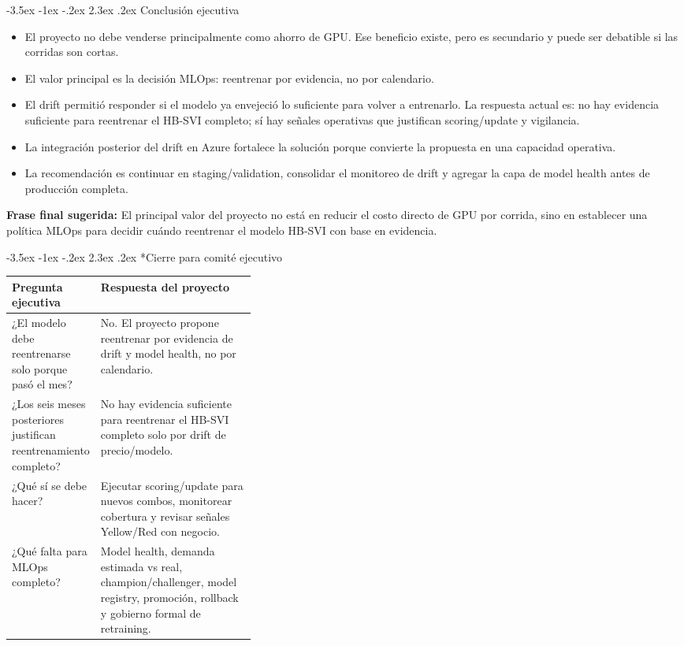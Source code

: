 \documentclass[11pt,letterpaper]{article}
\makeatletter
\renewcommand\section{\@startsection{section}{1}{\z@}
  {-3.5ex \@plus -1ex \@minus -.2ex}
  {2.3ex \@plus .2ex}
  {\Large\bfseries\sffamily\color{azulTec}}}
\newcommand{\statusbox}[1]{\colorbox{verdeClaro}{\parbox{\dimexpr\linewidth-2\fboxsep}{#1}}}
\makeatother
\begin{document}
\section{Conclusión ejecutiva}

\begin{itemize}
  \item El proyecto no debe venderse principalmente como ahorro de GPU. Ese beneficio existe, pero es secundario y puede ser debatible si las corridas son cortas.
  \item El valor principal es la decisión MLOps: reentrenar por evidencia, no por calendario.
  \item El drift permitió responder si el modelo ya envejeció lo suficiente para volver a entrenarlo. La respuesta actual es: no hay evidencia suficiente para reentrenar el HB-SVI completo; sí hay señales operativas que justifican scoring/update y vigilancia.
  \item La integración posterior del drift en Azure fortalece la solución porque convierte la propuesta en una capacidad operativa.
  \item La recomendación es continuar en staging/validation, consolidar el monitoreo de drift y agregar la capa de model health antes de producción completa.
\end{itemize}

\statusbox{\textbf{Frase final sugerida:} El principal valor del proyecto no está en reducir el costo directo de GPU por corrida, sino en establecer una política MLOps para decidir cuándo reentrenar el modelo HB-SVI con base en evidencia.}

\section*{Cierre para comité ejecutivo}

\begin{tabularx}{\linewidth}{L{0.36\linewidth}Y}
\toprule
\textbf{Pregunta ejecutiva} & \textbf{Respuesta del proyecto} \\
\midrule
¿El modelo debe reentrenarse solo porque pasó el mes? & No. El proyecto propone reentrenar por evidencia de drift y model health, no por calendario. \\
¿Los seis meses posteriores justifican reentrenamiento completo? & No hay evidencia suficiente para reentrenar el HB-SVI completo solo por drift de precio/modelo. \\
¿Qué sí se debe hacer? & Ejecutar scoring/update para nuevos combos, monitorear cobertura y revisar señales Yellow/Red con negocio. \\
¿Qué falta para MLOps completo? & Model health, demanda estimada vs real, champion/challenger, model registry, promoción, rollback y gobierno formal de retraining. \\
\bottomrule
\end{tabularx}
\end{document}
